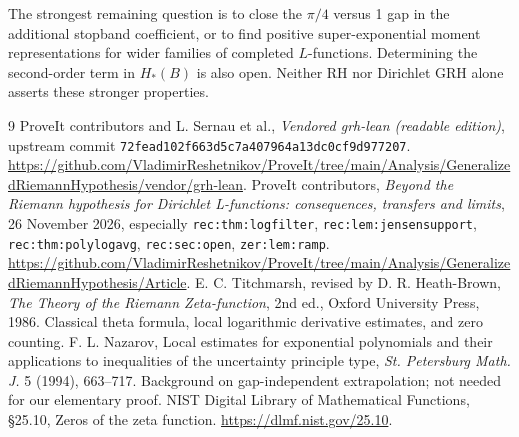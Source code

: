 \documentclass[11pt]{article}
\theoremstyle{remark}\newtheorem{remark}[theorem]{Remark}
\begin{document}
The strongest remaining question is to close the $\pi/4$ versus 1 gap in the additional stopband coefficient, or to find positive super-exponential moment representations for wider families of completed $L$-functions. Determining the second-order term in $H_*(B)$ is also open. Neither RH nor Dirichlet GRH alone asserts these stronger properties.

\begin{thebibliography}{9}
 ProveIt contributors and L. Sernau et al., \emph{Vendored grh-lean (readable edition)}, upstream commit \texttt{72fead102f663d5c7a407964a13dc0cf9d977207}. \url{https://github.com/VladimirReshetnikov/ProveIt/tree/main/Analysis/GeneralizedRiemannHypothesis/vendor/grh-lean}.
 ProveIt contributors, \emph{Beyond the Riemann hypothesis for Dirichlet L-functions: consequences, transfers and limits}, 26 November 2026, especially \texttt{rec:thm:logfilter}, \texttt{rec:lem:jensensupport}, \texttt{rec:thm:polylogavg}, \texttt{rec:sec:open}, \texttt{zer:lem:ramp}. \url{https://github.com/VladimirReshetnikov/ProveIt/tree/main/Analysis/GeneralizedRiemannHypothesis/Article}.
 E. C. Titchmarsh, revised by D. R. Heath-Brown, \emph{The Theory of the Riemann Zeta-function}, 2nd ed., Oxford University Press, 1986. Classical theta formula, local logarithmic derivative estimates, and zero counting.
 F. L. Nazarov, Local estimates for exponential polynomials and their applications to inequalities of the uncertainty principle type, \emph{St. Petersburg Math. J.} 5 (1994), 663--717. Background on gap-independent extrapolation; not needed for our elementary proof.
 NIST Digital Library of Mathematical Functions, \S25.10, Zeros of the zeta function. \url{https://dlmf.nist.gov/25.10}.
\end{thebibliography}
\end{document}
